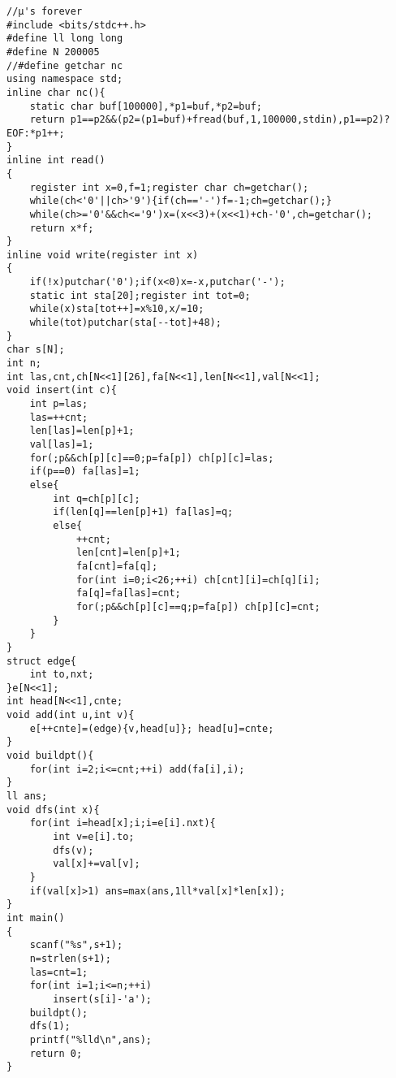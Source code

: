 \begin{verbatim}
//μ's forever
#include <bits/stdc++.h>
#define ll long long 
#define N 200005
//#define getchar nc
using namespace std;
inline char nc(){
    static char buf[100000],*p1=buf,*p2=buf;
    return p1==p2&&(p2=(p1=buf)+fread(buf,1,100000,stdin),p1==p2)?EOF:*p1++;
}
inline int read()
{
    register int x=0,f=1;register char ch=getchar();
    while(ch<'0'||ch>'9'){if(ch=='-')f=-1;ch=getchar();}
    while(ch>='0'&&ch<='9')x=(x<<3)+(x<<1)+ch-'0',ch=getchar();
    return x*f;
}
inline void write(register int x)
{
    if(!x)putchar('0');if(x<0)x=-x,putchar('-');
    static int sta[20];register int tot=0;
    while(x)sta[tot++]=x%10,x/=10;
    while(tot)putchar(sta[--tot]+48);
}
char s[N];
int n;
int las,cnt,ch[N<<1][26],fa[N<<1],len[N<<1],val[N<<1];
void insert(int c){
    int p=las;
    las=++cnt;
    len[las]=len[p]+1;
    val[las]=1;
    for(;p&&ch[p][c]==0;p=fa[p]) ch[p][c]=las;
    if(p==0) fa[las]=1;
    else{
        int q=ch[p][c];
        if(len[q]==len[p]+1) fa[las]=q;
        else{
            ++cnt;
            len[cnt]=len[p]+1;
            fa[cnt]=fa[q];
            for(int i=0;i<26;++i) ch[cnt][i]=ch[q][i];
            fa[q]=fa[las]=cnt;
            for(;p&&ch[p][c]==q;p=fa[p]) ch[p][c]=cnt;
        }
    }
}
struct edge{
    int to,nxt;
}e[N<<1];
int head[N<<1],cnte;
void add(int u,int v){
    e[++cnte]=(edge){v,head[u]}; head[u]=cnte;
}
void buildpt(){
    for(int i=2;i<=cnt;++i) add(fa[i],i);
}
ll ans;
void dfs(int x){
    for(int i=head[x];i;i=e[i].nxt){
        int v=e[i].to;
        dfs(v);
        val[x]+=val[v];
    }
    if(val[x]>1) ans=max(ans,1ll*val[x]*len[x]);
}
int main()
{
    scanf("%s",s+1);
    n=strlen(s+1);
    las=cnt=1;
    for(int i=1;i<=n;++i)
        insert(s[i]-'a');
    buildpt();
    dfs(1);
    printf("%lld\n",ans);
    return 0;
}
\end{verbatim}
